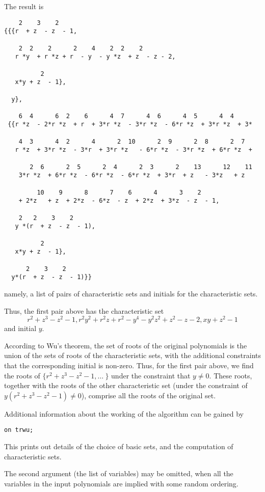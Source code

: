 The result is
\begin{verbatim}
    2    3    2
{{{r  + z  - z  - 1,

    2  2    2      2    4    2  2    2
   r *y  + r *z + r  - y  - y *z  + z  - z - 2,

          2
   x*y + z  - 1},

  y},

    6  4      6  2    6      4  7      4  6      4  5      4  4
 {{r *z  - 2*r *z  + r  + 3*r *z  - 3*r *z  - 6*r *z  + 3*r *z  + 3*

    4  3      4  2      4      2  10      2  9      2  8      2  7
   r *z  + 3*r *z  - 3*r  + 3*r *z   - 6*r *z  - 3*r *z  + 6*r *z  +

       2  6      2  5      2  4      2  3      2    13      12    11
    3*r *z  + 6*r *z  - 6*r *z  - 6*r *z  + 3*r  + z   - 3*z   + z

         10    9      8      7    6      4      3    2
    + 2*z   + z  + 2*z  - 6*z  - z  + 2*z  + 3*z  - z  - 1,

    2   2    3    2
   y *(r  + z  - z  - 1),

          2
   x*y + z  - 1},

      2    3    2
  y*(r  + z  - z  - 1)}}
\end{verbatim}
namely, a list of pairs of characteristic sets and initials for the
characteristic sets.

Thus, the first pair above has the characteristic set
$$ r^2 + z^3 - z^2 - 1,
r^2 y^2 + r^2 z + r^2 - y^4 - y^2 z^2 + z^2 - z - 2,
x y + z^2 - 1$$
and initial $y$.

According to Wu's theorem, the set of roots of the original polynomials
is the union of the sets of roots of the characteristic sets,
with the additional constraints that the
corresponding initial is non-zero. Thus, for the first pair above, we find the
roots of $\{ r^2 + z^3 - z^2 - 1, \ldots~\}$ under the constraint that
$y \neq 0$. These roots, together with the roots of the other
characteristic set (under the constraint of $y(r^2+z^3-z^2-1) \neq 0$),
comprise all the roots of the original set.

Additional information about the working of the algorithm can be gained by
\begin{verbatim}
on trwu;
\end{verbatim}
This prints out details of the choice of basic sets, and the computation
of characteristic sets.

The second argument (the list of variables) may be omitted, when all the
variables in the input polynomials are implied with some random ordering.

